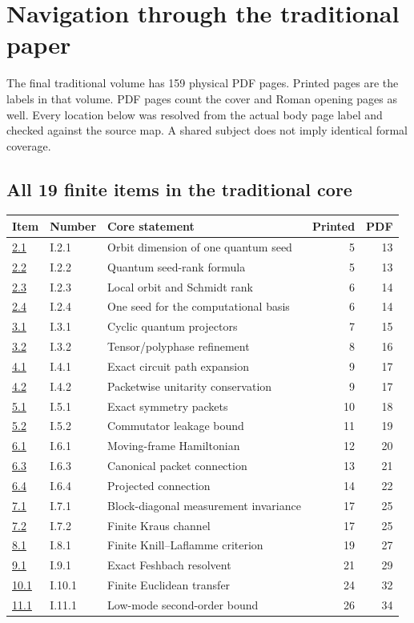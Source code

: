 \section{Navigation through the traditional paper}
\label{sec:traditional-navigation}
The final traditional volume has 159 physical PDF pages. Printed pages are the labels in that volume. PDF pages count the cover and Roman opening pages as well. Every location below was resolved from the actual body page label and checked against the source map. A shared subject does not imply identical formal coverage.

\subsection{All 19 finite items in the traditional core}
\begin{longtable}{@{}p{.10\linewidth}p{.13\linewidth}p{.49\linewidth}rr@{}}\toprule Item & Number & Core statement & Printed & PDF\\\midrule\endhead
\hyperref[result:2.1]{2.1} & I.2.1 & Orbit dimension of one quantum seed & 5 & 13\\
\hyperref[result:2.2]{2.2} & I.2.2 & Quantum seed-rank formula & 5 & 13\\
\hyperref[result:2.3]{2.3} & I.2.3 & Local orbit and Schmidt rank & 6 & 14\\
\hyperref[result:2.4]{2.4} & I.2.4 & One seed for the computational basis & 6 & 14\\
\hyperref[result:3.1]{3.1} & I.3.1 & Cyclic quantum projectors & 7 & 15\\
\hyperref[result:3.2]{3.2} & I.3.2 & Tensor/polyphase refinement & 8 & 16\\
\hyperref[result:4.1]{4.1} & I.4.1 & Exact circuit path expansion & 9 & 17\\
\hyperref[result:4.2]{4.2} & I.4.2 & Packetwise unitarity conservation & 9 & 17\\
\hyperref[result:5.1]{5.1} & I.5.1 & Exact symmetry packets & 10 & 18\\
\hyperref[result:5.2]{5.2} & I.5.2 & Commutator leakage bound & 11 & 19\\
\hyperref[result:6.1]{6.1} & I.6.1 & Moving-frame Hamiltonian & 12 & 20\\
\hyperref[result:6.3]{6.3} & I.6.3 & Canonical packet connection & 13 & 21\\
\hyperref[result:6.4]{6.4} & I.6.4 & Projected connection & 14 & 22\\
\hyperref[result:7.1]{7.1} & I.7.1 & Block-diagonal measurement invariance & 17 & 25\\
\hyperref[result:7.2]{7.2} & I.7.2 & Finite Kraus channel & 17 & 25\\
\hyperref[result:8.1]{8.1} & I.8.1 & Finite Knill--Laflamme criterion & 19 & 27\\
\hyperref[result:9.1]{9.1} & I.9.1 & Exact Feshbach resolvent & 21 & 29\\
\hyperref[result:10.1]{10.1} & I.10.1 & Finite Euclidean transfer & 24 & 32\\
\hyperref[result:11.1]{11.1} & I.11.1 & Low-mode second-order bound & 26 & 34\\
\bottomrule\end{longtable}
